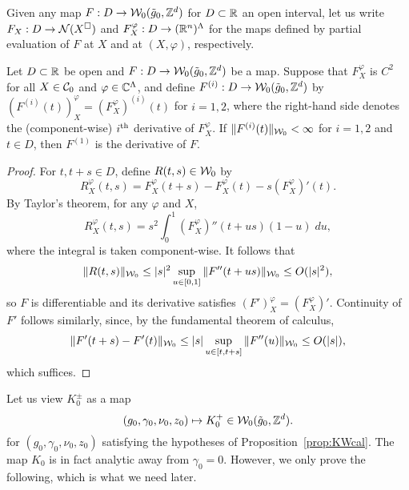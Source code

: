 Given any map $F : D \rightarrow \mathcal{W}_0(\tilde{g}_0, { {{\mathbb Z}}^d })$ for $D \subset {\mathbb R}$ an open interval,
let us write $F_X : D \rightarrow \mathcal{N}(X^\square)$ and $F^\varphi_X : D \rightarrow ({\mathbb R}^n)^\Lambda$ for the maps
defined by partial evaluation of $F$ at $X$ and at $(X, \varphi)$, respectively.

\begin{lemma}
\label{lem:smoothness}
Let $D \subset {\mathbb R}$ be open and $F : D \rightarrow \mathcal{W}_0(\tilde{g}_0, { {{\mathbb Z}}^d })$ be a map.
Suppose that $F^\varphi_X$ is $C^2$ for all $X \in \mathcal{C}_0$
and $\varphi \in \mathbb{C}^\Lambda$, and define 
$F^{(i)} : D \rightarrow \mathcal{W}_0(\tilde{g}_0, { {{\mathbb Z}}^d })$ by
$(F^{(i)}(t))^\varphi_X = (F^\varphi_X)^{(i)}(t)$ for $i = 1, 2$,
where the right-hand side denotes the (component-wise) $i^{\rm th}$
derivative of $F^\varphi_X$.
If $\|F^{(i)}(t)\|_{\mathcal{W}_0} < \infty$ for $i = 1, 2$ and $t \in D$, then 
$F^{(1)}$ is the derivative of $F$.
\end{lemma}

\begin{proof}
For $t, t + s \in D$, define $R(t, s) \in \mathcal{W}_0$ by
\begin{equation}
R^\varphi_X(t, s) = F^\varphi_X(t + s) - F^\varphi_X(t) - s (F^\varphi_X)'(t).
\end{equation}
By Taylor's theorem, for any $\varphi$ and $X$,
\begin{equation}
R^\varphi_X(t, s) = s^2 \int_0^1 (F^\varphi_X)''(t + u s) (1 - u) \; du,
\end{equation}
where the integral is taken component-wise.
It follows
that
\begin{equation}
\|R(t, s)\|_{\mathcal{W}_0}
  \le |s|^2 \sup_{u\in[0,1]} \|F''(t+us)\|_{\mathcal{W}_0}
  \le O(|s|^2),
\end{equation}
so $F$ is differentiable 
and its derivative satisfies $(F')^\varphi_X = (F^\varphi_X)'$.
Continuity of $F'$ follows similarly, since, by the
fundamental theorem of calculus,
\begin{equation}
\|F'(t+s) - F'(t)\|_{\mathcal{W}_0}
  \le
|s| \sup_{u\in[t,t+s]} \|F''(u)\|_{\mathcal{W}_0}
  \le
O(|s|),
\end{equation}
which suffices.
\end{proof}

Let us view $K^{\pm}_0$ as a map
\begin{equation}
(g_0, \gamma_0, \nu_0, z_0) \mapsto K^+_0 \in \mathcal{W}_0(\tilde{g}_0, { {{\mathbb Z}}^d }).
\end{equation}
for $(g_0, \gamma_0, \nu_0, z_0)$ satisfying the hypotheses
of Proposition~\ref{prop:KWcal}.
The map $K_0$ is in fact analytic away from $\gamma_0 = 0$.
However, we only prove the following, which is what we need later.

